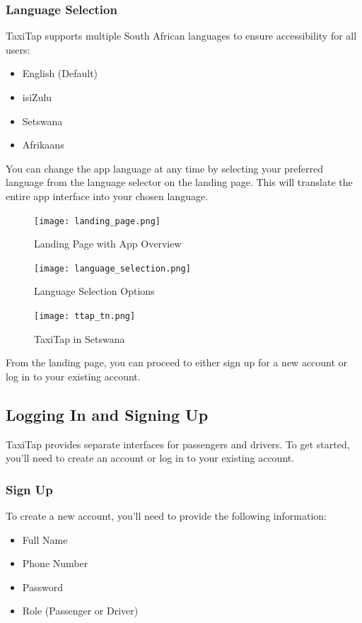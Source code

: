 \documentclass[12pt]{article}
\begin{document}
\subsubsection{Language Selection}
TaxiTap supports multiple South African languages to ensure accessibility for all users:
\begin{itemize}
    \item English (Default)
    \item isiZulu
    \item Setswana
    \item Afrikaans
\end{itemize}

You can change the app language at any time by selecting your preferred language from the language selector on the landing page. This will translate the entire app interface into your chosen language.

\begin{figure}[H]
  \centering
  \texttt{[image: landing\_page.png]}
  \caption{Landing Page with App Overview}
\end{figure}

\begin{figure}[H]
  \centering
  \texttt{[image: language\_selection.png]}
  \caption{Language Selection Options}
\end{figure}

\begin{figure}[H]
  \centering
  \texttt{[image: ttap\_tn.png]}
  \caption{TaxiTap in Setswana}
\end{figure}

From the landing page, you can proceed to either sign up for a new account or log in to your existing account.

\subsection{Logging In and Signing Up}

TaxiTap provides separate interfaces for passengers and drivers. To get started, you'll need to create an account or log in to your existing account.

\subsubsection{Sign Up}
To create a new account, you'll need to provide the following information:
\begin{itemize}
    \item Full Name
    \item Phone Number
    \item Password
    \item Role (Passenger or Driver)
\end{itemize}
\end{document}
